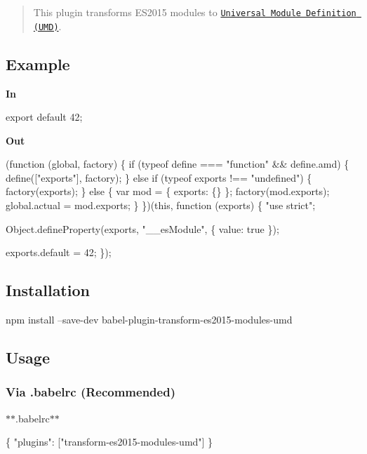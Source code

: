 \begin{quote}
This plugin transforms E\+S2015 modules to \href{https://github.com/umdjs/umd}{\tt Universal Module Definition (U\+MD)}. \end{quote}


\subsection*{Example}

{\bfseries In}


\begin{DoxyCode}
export default 42;
\end{DoxyCode}


{\bfseries Out}


\begin{DoxyCode}
(function (global, factory) \{
  if (typeof define === "function" && define.amd) \{
    define(["exports"], factory);
  \} else if (typeof exports !== "undefined") \{
    factory(exports);
  \} else \{
    var mod = \{
      exports: \{\}
    \};
    factory(mod.exports);
    global.actual = mod.exports;
  \}
\})(this, function (exports) \{
  "use strict";

  Object.defineProperty(exports, "\_\_esModule", \{
    value: true
  \});

  exports.default = 42;
\});
\end{DoxyCode}


\subsection*{Installation}


\begin{DoxyCode}
npm install --save-dev babel-plugin-transform-es2015-modules-umd
\end{DoxyCode}


\subsection*{Usage}

\subsubsection*{Via {\ttfamily .babelrc} (Recommended)}

$\ast$$\ast$.babelrc$\ast$$\ast$


\begin{DoxyCode}
\{
  "plugins": ["transform-es2015-modules-umd"]
\}
\end{DoxyCode}


